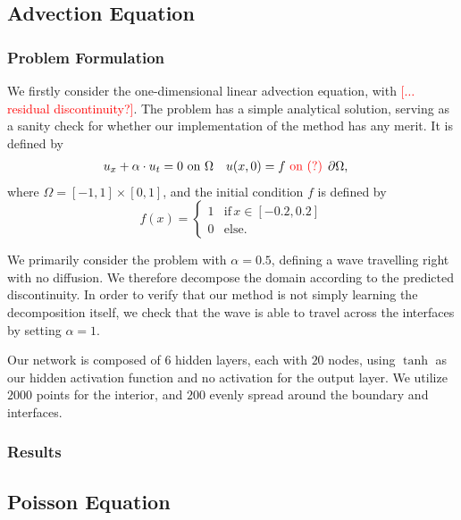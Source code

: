 \subsection{Advection Equation}
\subsubsection{Problem Formulation}
We firstly consider the one-dimensional linear advection equation, with \textcolor{red}{[$\ldots$ residual discontinuity?]}.
The problem has a simple analytical solution, serving as a sanity check for whether our implementation of the method has any merit.
It is defined by
\begin{align}
    u_x + \alpha \cdot u_t &= 0 \text{ on } \Omega & u(x, 0) &= f \text{ \textcolor{red}{on (?)} } \partial\Omega,
\end{align}
where $\Omega = [-1, 1] \times [0, 1]$, and the initial condition $f$ is defined by
\begin{equation*}
    f(x) =
    \begin{cases}
        1 &\text{if} \, x \in [-0.2, 0.2] \\
        0 &\text{else}.
    \end{cases}
\end{equation*}

We primarily consider the problem with $\alpha = 0.5$, defining a wave travelling right with no diffusion.
We therefore decompose the domain according to the predicted discontinuity.
In order to verify that our method is not simply learning the decomposition itself, we check that the wave is able to travel across the interfaces by setting $\alpha = 1$.

Our network is composed of $6$ hidden layers, each with $20$ nodes, using $\tanh$ as our hidden activation function and no activation for the output layer.
We utilize $2000$ points for the interior, and $200$ evenly spread around the boundary and interfaces. 

\subsubsection{Results}

\subsection{Poisson Equation}
